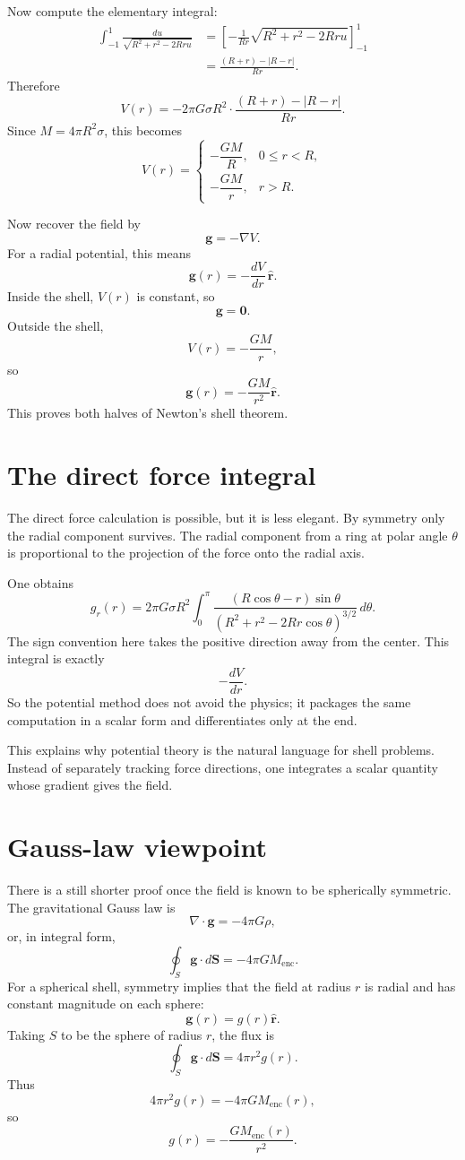 Now compute the elementary integral:
\[
\begin{aligned}
\int_{-1}^{1}
  \frac{du}{\sqrt{R^2+r^2-2Rru}}
&=\left[-\frac{1}{Rr}\sqrt{R^2+r^2-2Rru}\right]_{-1}^{1}\\
&=\frac{(R+r)-|R-r|}{Rr}.
\end{aligned}
\]
Therefore
\[
  V(r)=-2\pi G\sigma R^2\cdot
  \frac{(R+r)-|R-r|}{Rr}.
\]
Since \(M=4\pi R^2\sigma\), this becomes
\[
V(r)=
\begin{cases}
-\dfrac{GM}{R},&0\le r<R,\\[0.6em]
-\dfrac{GM}{r},&r>R.
\end{cases}
\]

Now recover the field by
\[
  \mathbf g=-\nabla V.
\]
For a radial potential, this means
\[
  \mathbf g(r)=-\frac{dV}{dr}\,\hat{\mathbf r}.
\]
Inside the shell, \(V(r)\) is constant, so
\[
  \mathbf g=\mathbf 0.
\]
Outside the shell,
\[
  V(r)=-\frac{GM}{r},
\]
so
\[
  \mathbf g(r)=-\frac{GM}{r^2}\hat{\mathbf r}.
\]
This proves both halves of Newton's shell theorem.

\section{The direct force integral}

The direct force calculation is possible, but it is less elegant.  By symmetry only the radial component survives.  The radial component from a ring at polar angle \(\theta\) is proportional to the projection of the force onto the radial axis.

One obtains
\[
  g_r(r)=2\pi G\sigma R^2
  \int_0^\pi
  \frac{(R\cos\theta-r)\sin\theta}
  {(R^2+r^2-2Rr\cos\theta)^{3/2}}\,d\theta.
\]
The sign convention here takes the positive direction away from the center.  This integral is exactly
\[
  -\frac{dV}{dr}.
\]
So the potential method does not avoid the physics; it packages the same computation in a scalar form and differentiates only at the end.

This explains why potential theory is the natural language for shell problems.  Instead of separately tracking force directions, one integrates a scalar quantity whose gradient gives the field.

\section{Gauss-law viewpoint}

There is a still shorter proof once the field is known to be spherically symmetric.  The gravitational Gauss law is
\[
  \nabla\cdot\mathbf g=-4\pi G\rho,
\]
or, in integral form,
\[
  \oint_S \mathbf g\cdot d\mathbf S=-4\pi G M_{\mathrm{enc}}.
\]
For a spherical shell, symmetry implies that the field at radius \(r\) is radial and has constant magnitude on each sphere:
\[
  \mathbf g(r)=g(r)\hat{\mathbf r}.
\]
Taking \(S\) to be the sphere of radius \(r\), the flux is
\[
  \oint_S \mathbf g\cdot d\mathbf S=4\pi r^2 g(r).
\]
Thus
\[
  4\pi r^2 g(r)=-4\pi G M_{\mathrm{enc}}(r),
\]
so
\[
  g(r)=-\frac{G M_{\mathrm{enc}}(r)}{r^2}.
\]

